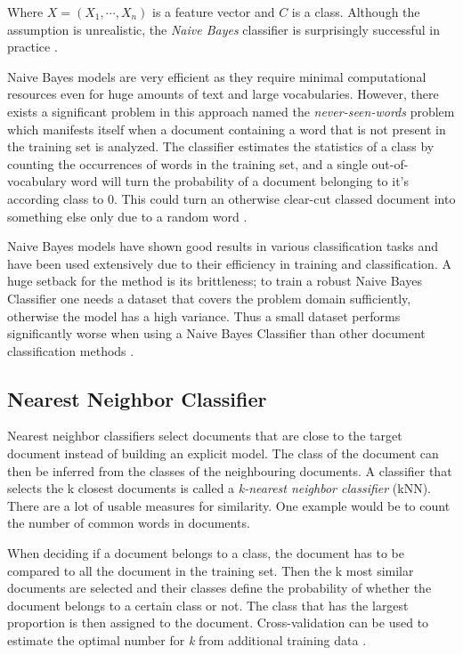 Where $X = (X_{1},\cdots, X_{n})$ is a feature vector and $C$ is a class.
Although the assumption is unrealistic, the \textit{Naive Bayes} classifier is surprisingly successful in practice \cite{rish}.

Naive Bayes models are very efficient as they require minimal computational resources even for huge amounts of text and large vocabularies.
However, there exists a significant problem in this approach named the \textit{never-seen-words} problem which manifests itself when a document containing a word that is not present in the training set is analyzed.
The classifier estimates the statistics of a class by counting the occurrences of words in the training set, and a single out-of-vocabulary word will turn the probability of a document belonging to it's according class to 0.
This could turn an otherwise clear-cut classed document into something else only due to a random word \cite{rigutini2004}.

Naive Bayes models have shown good results in various classification tasks and have been used extensively due to their efficiency in training and classification.
A huge setback for the method is its brittleness; to train a robust Naive Bayes Classifier one needs a dataset that covers the problem domain sufficiently, otherwise the model has a high variance.
Thus a small dataset performs significantly worse when using a Naive Bayes Classifier than other document classification methods \cite{rigutini2004} \cite{lewis1998}.

\subsection{Nearest Neighbor Classifier} \label{Nearest Neighbor Classifier}
Nearest neighbor classifiers select documents that are close to the target document instead of building an explicit model.
The class of the document can then be inferred from the classes of the neighbouring documents.
A classifier that selects the k closest documents is called a \textit{k-nearest neighbor classifier} (kNN).
There are a lot of usable measures for similarity. One example would be to count the number of common words in documents.

When deciding if a document belongs to a class, the document has to be compared to all the document in the training set.
Then the k most similar documents are selected and their classes define the probability of whether the document belongs to a certain class or not.
The class that has the largest proportion is then assigned to the document.
Cross-validation can be used to estimate the optimal number for \textit{k} from additional training data \cite{hotho}.

